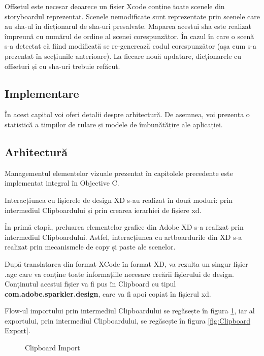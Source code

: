 Offsetul este necesar deoarece un fișier Xcode conține toate scenele din storyboardul reprezentat.  Scenele nemodificate sunt reprezentate prin scenele care au sha-ul în dicționarul de sha-uri presalvate. Maparea acestui sha este realizat împreună cu numărul de ordine al scenei corespunzător. 
În cazul în care o scenă s-a detectat că fiind modificată se re-generează codul corespunzător (așa cum s-a prezentat în secțiunile anterioare).  La fiecare nouă updatare, dicționarele cu offseturi și cu sha-uri trebuie refăcut. 


\subsection{Implementare}

În acest capitol voi oferi detalii despre arhitectură. De asemnea, voi prezenta o statistică a timpilor de rulare și modele de îmbunătățire ale aplicației.

\subsection{Arhitectură}

  
Managementul elementelor vizuale prezentat în capitolele precedente este implementat integral în Objective C. 

Interacțiunea cu fișierele de design XD s-au realizat în două moduri: prin intermediul Clipboardului și prin crearea ierarhiei de fișiere xd.

În primă etapă, preluarea elementelor grafice din Adobe XD s-a realizat prin intermediul Clipboardului. Astfel, interacțiunea cu artboardurile din XD s-a realizat prin mecanismele de copy și paste ale scenelor.

După translatarea din format XCode în format XD, va rezulta un singur fișier .agc care va conține toate informațiile necesare creării fișierului de design. Conținutul acestui fișier va fi pus în Clipboard cu tipul \textbf{com.adobe.sparkler.design}, care va fi apoi copiat în fișierul xd.

Flow-ul importului prin intermediul Clipboardului se regăsește în figura \ref{fig:Clipboard Import}, iar al exportului, prin intermediul Clipboardului, se regăsește în figura \ref{fig:Clipboard Export}.


\begin{figure}[!htbp]
\centering
{}
\caption{Clipboard Import} \label{fig:Clipboard Import}
\end{figure}

